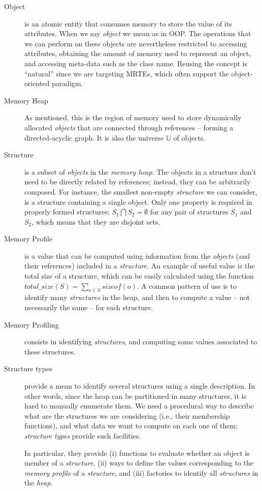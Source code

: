 \begin{description}
\item[Object] is an atomic entity that consumes memory to store the value of its attributes.
When we say \textit{object} we mean as in \gls{OOP}.
The operations that we can perform on these objects are nevertheless restricted to accessing attributes, obtaining the amount of memory used to represent an object, and accessing meta-data such as the class name.
Reusing the concept is ``natural'' since we are targeting MRTEs, which often support the object-oriented paradigm.

\item[Memory Heap] As mentioned, this is the region of memory used to store dynamically allocated \textit{objects} that are connected through references -- forming a directed-acyclic graph.
It is also the universe $\mathbb{U}$ of objects.

\item[Structure] is a subset of \textit{objects} in the \textit{memory heap}.
The objects in a structure don't need to be directly related by references; instead, they can be arbitrarily composed.
For instance, the smallest non-empty \textit{structure} we can consider, is a structure containing a single object.
Only one property is required in properly formed structures;  $S_1 \bigcap S_2 = \emptyset$ for any pair of structures $S_1$ and $S_2$, which means that they are disjoint sets.

\item[Memory Profile] is a value that can be computed using information from the \textit{objects} (and their references) included in a \textit{structure}.
An example of useful value is the total size of a structure, which can be easily calculated using the function $\textit{total\_size}\left(S\right) = \sum_{o \in S} {sizeof(o)}$.
A common pattern of use is to identify many \textit{structures} in the heap, and then to compute a value -- not necessarily the same -- for each structure.

\item[Memory Profiling] consists in identifying \textit{structures}, and computing some values associated to these structures. 

\item[Structure types] provide a mean to identify several structures using a single description.
In other words, since the heap can be partitioned in many structures, it is hard to manually enumerate them.
We need a procedural way to describe what are the structures we are considering (i.e., their membership functions), and what data we want to compute on each one of them; \textit{structure types} provide such facilities.

In particular, they provide (i) functions to evaluate whether an object is member of a \textit{structure}, (ii) ways to define the values corresponding to the \textit{memory profile} of a \textit{structure}, and (iii) factories to identify all \textit{structures} in the \textit{heap}.

\end{description}

